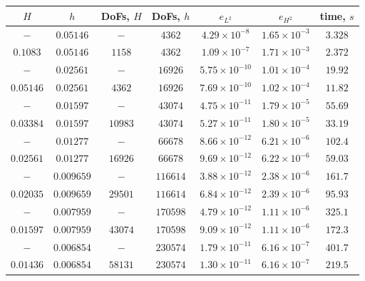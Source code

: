 \begin{table}
  \begin{center}
    {\small
    \begin{tabular}{|c|c|c|c|c|c|c|}
      \hline
        $H$ & $h$    & DoFs, $H$ & DoFs, $h$ & $e_{L^2}$ & $e_{H^2}$ & time, $s$ \\
      \hline
      $-$         & $0.05146$   & $-$       & $4362$    & $4.29\times 10^{-8}$
        & $1.65\times 10^{-3}$ & $3.328$ \\
      $0.1083$    & $0.05146$   & $1158$    & $4362$    & $1.09\times 10^{-7}$
        & $1.71\times 10^{-3}$            & $2.372$ \\
      $-$         & $0.02561$   & $-$       & $16926$   & $5.75\times 10^{-10}$
        & $1.01\times 10^{-4}$ & $19.92$ \\
      $0.05146$   & $0.02561$   & $4362$    & $16926$   & $7.69\times 10^{-10}$
        & $1.02\times 10^{-4}$           & $11.82$ \\
      $-$         & $0.01597$   & $-$       & $43074$   & $4.75\times 10^{-11}$
        & $1.79\times 10^{-5}$ & $55.69$ \\
      $0.03384$   & $0.01597$   & $10983$   & $43074$   & $5.27\times 10^{-11}$
        & $1.80\times 10^{-5}$ & $33.19$ \\
      $-$         & $0.01277$   & $-$       & $66678$   & $8.66\times 10^{-12}$
        & $6.21\times 10^{-6}$ & $102.4$ \\
      $0.02561$   & $0.01277$   & $16926$   & $66678$   & $9.69\times 10^{-12}$
        & $6.22\times 10^{-6}$ & $59.03$ \\
      $-$         & $0.009659$  & $-$       & $116614$  & $3.88\times 10^{-12}$
        & $2.38\times 10^{-6}$ & $161.7$ \\
      $0.02035$   & $0.009659$  & $29501$   & $116614$  & $6.84\times 10^{-12}$
        & $2.39\times 10^{-6}$ & $95.93$ \\
      $-$         & $0.007959$  & $-$       & $170598$  & $4.79\times 10^{-12}$
        & $1.11\times 10^{-6}$ & $325.1$ \\
      $0.01597$   & $0.007959$  & $43074$   & $170598$  & $9.09\times 10^{-12}$
        & $1.11\times 10^{-6}$ & $172.3$ \\
      $-$         & $0.006854$  & $-$       & $230574$  & $1.79\times 10^{-11}$
        & $6.16\times 10^{-7}$ & $401.7$ \\
      $0.01436$   & $0.006854$  & $58131$   & $230574$  & $1.30\times 10^{-11}$
        & $6.16\times 10^{-7}$ & $219.5$ \\

\end{tabular}}
\end{center}
\end{table}
